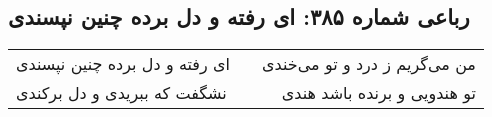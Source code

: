 \begin{center}
\section*{رباعی شماره ۳۸۵: ای رفته و دل برده چنین نپسندی}
\label{sec:sh385}
\begin{longtable}{l p{0.5cm} r}
ای رفته و دل برده چنین نپسندی
&&
من می‌گریم ز درد و تو می‌خندی
\\
نشگفت که ببریدی و دل برکندی
&&
تو هندویی و برنده باشد هندی
\\
\end{longtable}
\end{center}
